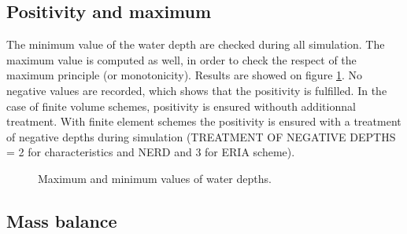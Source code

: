 


\subsection{Positivity and maximum}

The minimum value of the water depth are checked during all simulation. 
The maximum value is computed as well, in order to check the respect of the maximum principle (or monotonicity). 
Results are showed on figure \ref{t2d:balzano:minmax}. 
No negative values are recorded, which shows that the positivity is fulfilled.
In the case of finite volume schemes, positivity is ensured withouth additionnal treatment.
With finite element schemes the positivity is ensured with a treatment of negative depths
during simulation (TREATMENT OF NEGATIVE DEPTHS = 2 for characteristics and NERD and 3 for ERIA scheme).

\begin{figure}[H]
\centering
{}
\caption{Maximum and minimum values of water depths.}
\label{t2d:balzano:minmax}
\end{figure}

\subsection{Mass balance}

